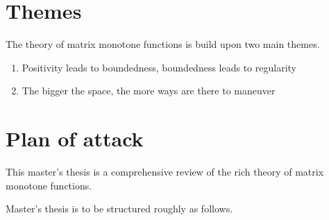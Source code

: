 \section{Themes}

The theory of matrix monotone functions is build upon two main themes.

\begin{enumerate}
	\item Positivity leads to boundedness, boundedness leads to regularity
	\item The bigger the space, the more ways are there to maneuver
\end{enumerate}

\section{Plan of attack}

This master's thesis is a comprehensive review of the rich theory of matrix monotone functions.

Master's thesis is to be structured roughly as follows.

